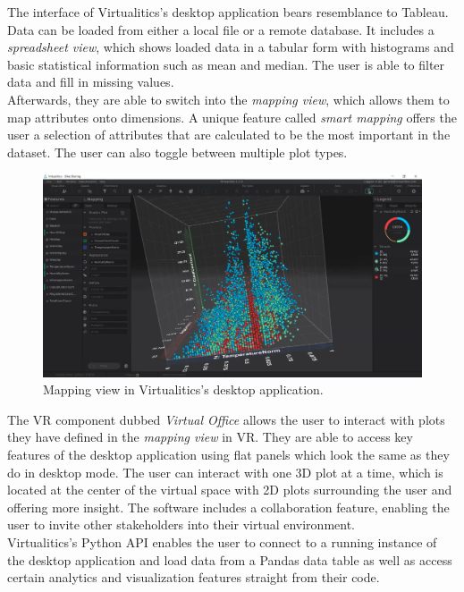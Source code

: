 \documentclass{article}
\begin{document}
The interface of Virtualitics's desktop application bears resemblance to Tableau. Data can be loaded from either a local file or a remote database. It includes a \emph{spreadsheet view}, which shows loaded data in a tabular form with histograms and basic statistical information such as mean and median. The user is able to filter data and fill in missing values.\\

Afterwards, they are able to switch into the \emph{mapping view}, which allows them to map attributes onto dimensions. A unique feature called \emph{smart mapping} offers the user a selection of attributes that are calculated to be the most important in the dataset. The user can also toggle between multiple plot types.\\

\begin{figure}[!h]
\centering
\includegraphics[scale=0.18]{images/virtualitics_mapping}
\caption{Mapping view in Virtualitics's desktop application.\cite{virtualiticsvideo}}
\label{fig:virtualiticsmap}
\end{figure}

The VR component dubbed \emph{Virtual Office} allows the user to interact with plots they have defined in the \emph{mapping view} in VR. They are able to access key features of the desktop application using flat panels which look the same as they do in desktop mode. The user can interact with one 3D plot at a time, which is located at the center of the virtual space with 2D plots surrounding the user and offering more insight. The software includes a collaboration feature, enabling the user to invite other stakeholders into their virtual environment.\\

Virtualitics's Python API enables the user to connect to a running instance of the desktop application and load data from a Pandas data table as well as access certain analytics and visualization features straight from their code.\\
\end{document}
